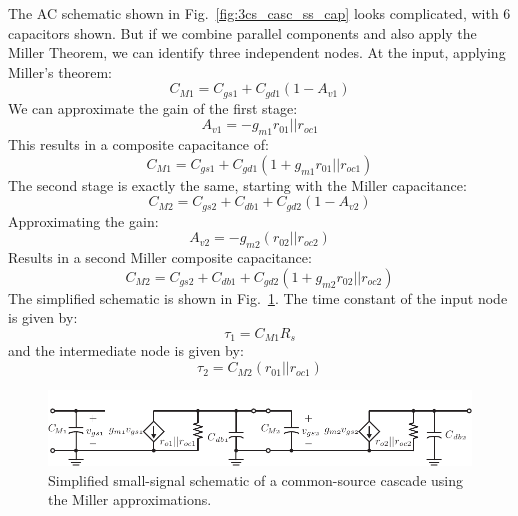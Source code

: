 The AC schematic shown in Fig.~\ref{fig:3cs_casc_ss_cap} looks complicated, with 6 capacitors shown.  But if we combine parallel components and also apply the Miller Theorem, we can identify three independent nodes.  At the input, applying Miller's theorem:
% 
\begin{equation} 
	C_{M1} = C_{gs1} + C_{gd1} (1 - A_{v1}) 
\end{equation}
%
We can approximate the gain of the first stage:
%
\begin{equation} 
	A_{v1} = -g_{m1} r_{01}||r_{oc1} 
\end{equation}
%
This results in a composite capacitance of:
%
\begin{equation} 
	C_{M1} = C_{gs1} + C_{gd1} (1 + g_{m1} r_{01}||r_{oc1}) 
\end{equation}
%
The second stage is exactly the same, starting with the Miller capacitance:
\begin{equation} 
	C_{M2} = C_{gs2} + C_{db1} + C_{gd2} (1 - A_{v2}) 
\end{equation}
%
Approximating the gain:
\begin{equation} 
	A_{v2} = -g_{m2} (r_{02}||r_{oc2})
\end{equation}
%
Results in a second Miller composite capacitance:
%
\begin{equation} 
	C_{M2} = C_{gs2} + C_{db1} + C_{gd2} (1 + g_{m2} r_{02}||r_{oc2}) 
\end{equation}
%
The simplified schematic is shown in Fig.~\ref{fig:4cs_casc_ss_cap_miller}.  The time constant of the input node is given by:
\begin{equation}
 \tau_1 = C_{M1} R_s 
\end{equation}
% 
and the intermediate node is given by:
\begin{equation} 
 \tau_2 = C_{M2} (r_{01} || r_{oc1}) 
\end{equation}

\begin{figure}[tb]
\begin{center}
\includegraphics[scale=1]{4cs_casc_ss_cap_miller}
\end{center}
\caption{Simplified small-signal schematic of a common-source cascade using the Miller approximations.} \label{fig:4cs_casc_ss_cap_miller}
\end{figure}

